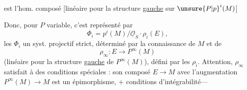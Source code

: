 est l'hom. composé [linéaire pour la structure \uline{gauche} sur $\unsure{P|p}^{i}(M)$]

Donc, pour $P$ variable, c'est représenté par
\[
 \Phi_i=p^i(M)/\underline{\mathcal O}_S\cdot\rho_i(E),
\]
les $\Phi_i$  un syst. projectif strict, déterminé par la connaissance de $M$ et de
\[
 \rho_\infty:E\longrightarrow P^\infty(M)
\]
(linéaire pour la structure \uline{gauche} de $P^\infty(M)$), défini par les $\rho_i$. Attention,  $\rho_\infty$ satisfait à des  conditions spéciales : son composé $E\longrightarrow M$ avec l'augmentation $P^\infty(M)\longrightarrow M$ est un épimorphisme, $+$ conditions d'intégrabilité---
